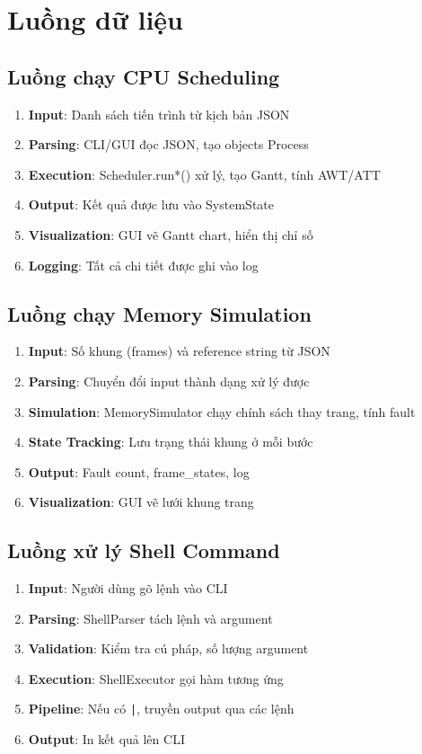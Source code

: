 \section{Luồng dữ liệu}

\subsection{Luồng chạy CPU Scheduling}

\begin{enumerate}[leftmargin=1.5cm]
  \item \textbf{Input}: Danh sách tiến trình từ kịch bản JSON
  \item \textbf{Parsing}: CLI/GUI đọc JSON, tạo objects Process
  \item \textbf{Execution}: Scheduler.run*() xử lý, tạo Gantt, tính AWT/ATT
  \item \textbf{Output}: Kết quả được lưu vào SystemState
  \item \textbf{Visualization}: GUI vẽ Gantt chart, hiển thị chỉ số
  \item \textbf{Logging}: Tất cả chi tiết được ghi vào log
\end{enumerate}

\subsection{Luồng chạy Memory Simulation}

\begin{enumerate}[leftmargin=1.5cm]
  \item \textbf{Input}: Số khung (frames) và reference string từ JSON
  \item \textbf{Parsing}: Chuyển đổi input thành dạng xử lý được
  \item \textbf{Simulation}: MemorySimulator chạy chính sách thay trang, tính fault
  \item \textbf{State Tracking}: Lưu trạng thái khung ở mỗi bước
  \item \textbf{Output}: Fault count, frame\_states, log
  \item \textbf{Visualization}: GUI vẽ lưới khung trang
\end{enumerate}

\subsection{Luồng xử lý Shell Command}

\begin{enumerate}[leftmargin=1.5cm]
  \item \textbf{Input}: Người dùng gõ lệnh vào CLI
  \item \textbf{Parsing}: ShellParser tách lệnh và argument
  \item \textbf{Validation}: Kiểm tra cú pháp, số lượng argument
  \item \textbf{Execution}: ShellExecutor gọi hàm tương ứng
  \item \textbf{Pipeline}: Nếu có \verb+|+, truyền output qua các lệnh
  \item \textbf{Output}: In kết quả lên CLI
\end{enumerate}

